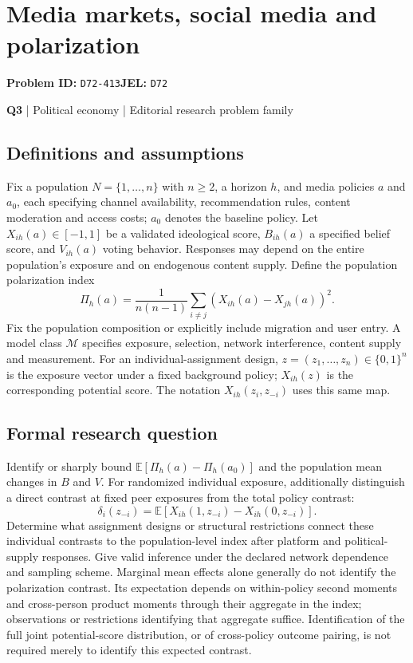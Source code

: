 \documentclass[11pt,a4paper]{article}
\begin{document}
\section*{Media markets, social media and polarization}
\textbf{Problem ID:} \texttt{D72-413}\quad \textbf{JEL:} \texttt{D72}\par
\label{problem:OP-0123}
\label{atlas:prob:Q3}
{\sffamily\small\color{muted}\textbf{Q3} | Political economy | Editorial research problem family\par}
\subsection*{Definitions and assumptions}
Fix a population $N=\{1,\ldots,n\}$ with $n\geq2$, a horizon $h$, and media policies $a$ and $a_0$, each specifying channel availability, recommendation rules, content moderation and access costs; $a_0$ denotes the baseline policy. Let $X_{ih}(a)\in[-1,1]$ be a validated ideological score, $B_{ih}(a)$ a specified belief score, and $V_{ih}(a)$ voting behavior. Responses may depend on the entire population's exposure and on endogenous content supply. Define the population polarization index
\[
\Pi_h(a)=\frac{1}{n(n-1)}\sum_{i\ne j}(X_{ih}(a)-X_{jh}(a))^2.
\]
Fix the population composition or explicitly include migration and user entry. A model class $\mathcal M$ specifies exposure, selection, network interference, content supply and measurement. For an individual-assignment design, $z=(z_1,\ldots,z_n)\in\{0,1\}^n$ is the exposure vector under a fixed background policy; $X_{ih}(z)$ is the corresponding potential score. The notation $X_{ih}(z_i,z_{-i})$ uses this same map.
\subsection*{Formal research question}
Identify or sharply bound $\mathbb E[\Pi_h(a)-\Pi_h(a_0)]$ and the population mean changes in $B$ and $V$. For randomized individual exposure, additionally distinguish a direct contrast at fixed peer exposures from the total policy contrast:
\[
\delta_i(z_{-i})=\mathbb E[X_{ih}(1,z_{-i})-X_{ih}(0,z_{-i})].
\]
Determine what assignment designs or structural restrictions connect these individual contrasts to the population-level index after platform and political-supply responses. Give valid inference under the declared network dependence and sampling scheme. Marginal mean effects alone generally do not identify the polarization contrast. Its expectation depends on within-policy second moments and cross-person product moments through their aggregate in the index; observations or restrictions identifying that aggregate suffice. Identification of the full joint potential-score distribution, or of cross-policy outcome pairing, is not required merely to identify this expected contrast.
\end{document}
